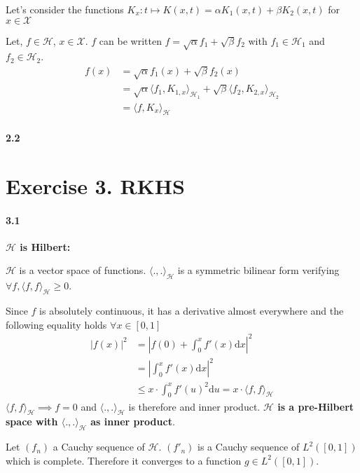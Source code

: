 \documentclass[10pt]{article}
\begin{document}
    Let's consider the functions $K_x : t \mapsto K(x,t) = \alpha K_1(x,t) + 
    \beta K_2(x, t)$ for $x \in \mathcal{X}$

    Let, $f\in \mathcal{H}$, $x\in \mathcal{X}$. $f$ can be written $f = 
    \sqrt{\alpha}f_1 + \sqrt{\beta}f_2$ with $f_1 \in \mathcal{H}_1$ and
    $f_2 \in \mathcal{H}_2$. 
    \begin{align*}
        f(x) &= \sqrt{\alpha}f_1(x) + \sqrt{\beta}f_2(x)\\
        &= \sqrt{\alpha}\langle f_1, K_{1,x}\rangle_{\mathcal{H}_1} + 
        \sqrt{\beta}\langle f_2, K_{2,x}\rangle_{\mathcal{H}_2}\\
        &=\langle f, K_x \rangle_{\mathcal{H}}
    \end{align*}
    \paragraph{2.2}

    \section*{Exercise 3. RKHS}
    \paragraph{3.1} \textbf{ $\mathcal{H}$ is Hilbert: }
    
    $\mathcal{H}$ is a vector space of functions. $\langle ., .
    \rangle_\mathcal{H}$ is a symmetric bilinear form verifying $\forall f, 
    \langle f, f \rangle_\mathcal{H} \geq 0$.
    
    Since $f$ is absolutely continuous, it has a derivative almost everywhere 
    and the following equality holds $\forall x \in [0, 1]$
    \begin{align*}
        |f(x)|^2 &= \left| f(0) + \int_0^x f'(x)\text{d}x \right|^2\\
        &= \left| \int_0^x f'(x)\text{d}x \right|^2 \tag{$f(0) = 0$}\\ 
        &\leq x\cdot\int_0^x f'(u)^2\text{d}u = x \cdot
        \langle f, f \rangle_\mathcal{H}
    \end{align*}
    $\langle f, f \rangle_\mathcal{H} \implies f = 0$ and $\langle ., .
    \rangle_\mathcal{H}$ is therefore and inner product. \textbf{$\mathcal{H}$
    is a pre-Hilbert space with $\langle ., . \rangle_\mathcal{H}$ as inner 
    product}.

    Let $(f_n)$ a Cauchy sequence of $\mathcal{H}$. $(f'_n)$ is a Cauchy 
    sequence of  $L^2([0,1])$ which is complete. Therefore it converges to a 
    function $g \in L^2([0,1])$.
\end{document}
